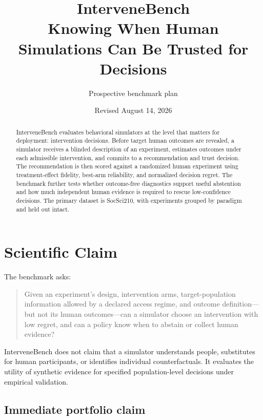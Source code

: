 \documentclass[11pt]{article}
\title{\textbf{InterveneBench}\\Knowing When Human Simulations Can Be Trusted for Decisions}
\author{Prospective benchmark plan}
\date{Revised August 14, 2026}
\begin{document}
\maketitle

\begin{abstract}
InterveneBench evaluates behavioral simulators at the level that matters for deployment: intervention decisions. Before target human outcomes are revealed, a simulator receives a blinded description of an experiment, estimates outcomes under each admissible intervention, and commits to a recommendation and trust decision. The recommendation is then scored against a randomized human experiment using treatment-effect fidelity, best-arm reliability, and normalized decision regret. The benchmark further tests whether outcome-free diagnostics support useful abstention and how much independent human evidence is required to rescue low-confidence decisions. The primary dataset is SocSci210, with experiments grouped by paradigm and held out intact.
\end{abstract}

\section{Scientific Claim}

The benchmark asks:

\begin{quote}
Given an experiment's design, intervention arms, target-population information allowed by a declared access regime, and outcome definition---but not its human outcomes---can a simulator choose an intervention with low regret, and can a policy know when to abstain or collect human evidence?
\end{quote}

InterveneBench does not claim that a simulator understands people, substitutes for human participants, or identifies individual counterfactuals. It evaluates the utility of synthetic evidence for specified population-level decisions under empirical validation.

\subsection*{Immediate portfolio claim}
\end{document}
